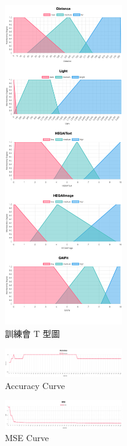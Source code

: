 \documentclass[twocolumn,11pt,a4paper]{article}
\begin{document}
\begin{figure}[htbp]
    \centering
    \includegraphics[width=0.45\textwidth]{res/image/all_AL.png} %
    \caption{訓練會 T 型圖}
    \label{fig:all_AL}  
\end{figure}

\begin{figure}[htbp]
    \centering
    \includegraphics[width=0.45\textwidth]{res/image/accuracy.png} %
    \caption{Accuracy Curve} %
    \label{fig:accuracy_curve} %
\end{figure}

\begin{figure}[htbp]
    \centering
    \includegraphics[width=0.45\textwidth]{res/image/mse.png} %
    \caption{MSE Curve} %
    \label{fig:mse_curve} %
\end{figure}
\end{document}

